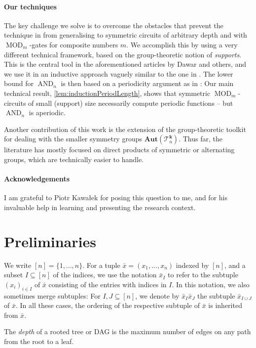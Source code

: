 \documentclass[11pt]{article}
\DeclareMathOperator{\MOD}{MOD}
\DeclareMathOperator{\AND}{AND}
\newcommand{\Aut}{\mathbf{Aut}}
\newcommand{\Tt}{{\mathcal T}}
\theoremstyle{definition}
\theoremstyle{plain}
\theoremstyle{remark}
\theoremstyle{remark}
\begin{document}
 \paragraph*{Our techniques}
The key challenge we solve is to overcome the obstacles that prevent the technique in
 \cite{kawalekweiss25} from generalising to symmetric circuits of arbitrary depth and with $\MOD_m$-gates for composite numbers $m$. We accomplish this by using a very different technical framework, based on the group-theoretic notion of \emph{supports}. This is the central tool in the aforementioned articles by Dawar and others, and we use it in an inductive approach vaguely similar to the one in \cite{SymHomPolynomials}.
 The lower bound for $\AND_n$ is then based on a periodicity argument as in \cite{kawalekweiss25}:
 Our main technical result, \cref{lem:inductionPeriodLength}, shows that symmetric $\MOD_m$-circuits of small (support) size necessarily compute periodic functions -- but $\AND_n$ is aperiodic.
 
 Another contribution of this work is the extension of the group-theoretic toolkit for dealing with the smaller symmetry groups $\Aut(\Tt_n^{\boldsymbol{k}})$. Thus far, the literature has mostly focused on direct products of symmetric or alternating groups, which are technically easier to handle. 
 
\paragraph*{Acknowledgements}
I am grateful to Piotr Kawa\l ek for posing this question to me, and for his invaluable help in learning and presenting the research context.




\section{Preliminaries}
\label{sec:preliminaries}
We write $[n] = \{1, \dots, n\}$.
For a tuple $\bar{x} = (x_1, \dots, x_n)$ indexed by $[n]$, and a subset $I \subseteq [n]$ of the indices, we use the notation $\bar{x}_I$ to refer to the subtuple $(x_i)_{i \in I}$ of $\bar{x}$ consisting of the entries with indices in $I$. 
In this notation, we also sometimes merge subtuples:
For $I, J \subseteq [n]$, we denote by $\bar{x}_I\bar{x}_J$ the subtuple $\bar{x}_{I \cup J}$ of $\bar{x}$. In all these cases, the ordering of the respective subtuple of $\bar{x}$ is inherited from $\bar{x}$.

The \emph{depth} of a rooted tree or DAG is the maximum number of edges on any path from the root to a leaf.
\end{document}
